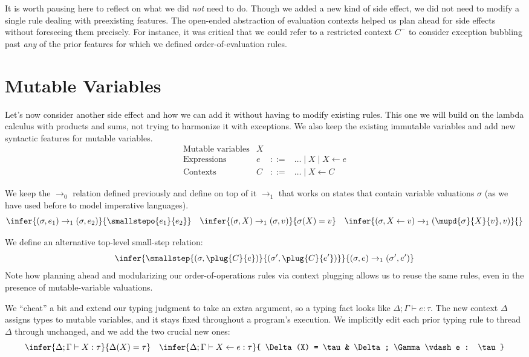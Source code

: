 \documentclass{amsbook}
\theoremstyle{definition}
\theoremstyle{remark}
\numberwithin{section}{chapter}
\numberwithin{equation}{chapter}
\begin{document}
It is worth pausing here to reflect on what we did \emph{not} need to do.
Though we added a new kind of side effect, we did not need to modify a single rule dealing with preexisting features.
The open-ended abstraction of evaluation contexts helped us plan ahead for side effects without foreseeing them precisely.
For instance, it was critical that we could refer to a restricted context $C^-$ to consider exception bubbling past \emph{any} of the prior features for which we defined order-of-evaluation rules.

\section{Mutable Variables\label{mutable_variables}}

Let's now consider another side effect and how we can add it without having to modify existing rules.
This one we will build on the lambda calculus with products and sums, not trying to harmonize it with exceptions.
We also keep the existing immutable variables and add new syntactic features for mutable variables.
$$\begin{array}{rrcl}
  \textrm{Mutable variables} & X \\
  \textrm{Expressions} & e &::=& \ldots \mid X \mid X \leftarrow e \\
  \textrm{Contexts} & C &::=& \ldots \mid X \leftarrow C
\end{array}$$

\newcommand{\smallstepw}[2]{#1 \to_1 #2}

We keep the $\rightarrow_0$ relation defined previously and define on top of it $\rightarrow_1$ that works on states that contain variable valuations $\sigma$ (as we have used before to model imperative languages).
$$\infer{\smallstepw{(\sigma, e_1)}{(\sigma, e_2)}}{
  \smallstepo{e_1}{e_2}
}
\quad \infer{\smallstepw{(\sigma, X)}{(\sigma, v)}}{
  \sigma(X) = v
}
\quad \infer{\smallstepw{(\sigma, X \leftarrow v)}{(\mupd{\sigma}{X}{v}, v)}}{
}$$

We define an alternative top-level small-step relation:
$$\infer{\smallstep{(\sigma, \plug{C}{e})}{(\sigma', \plug{C}{e'})}}{
  \smallstepw{(\sigma, e)}{(\sigma', e')}
}$$
Note how planning ahead and modularizing our order-of-operations rules via context plugging allows us to reuse the same rules, even in the presence of mutable-variable valuations.

\newcommand{\rhasty}[4]{#1; #2 \vdash #3 : #4}

We ``cheat'' a bit and extend our typing judgment to take an extra argument, so a typing fact looks like $\rhasty{\Delta}{\Gamma}{e}{\tau}$.
The new context $\Delta$ assigns types to mutable variables, and it stays fixed throughout a program's execution.
We implicitly edit each prior typing rule to thread $\Delta$ through unchanged, and we add the two crucial new ones:
$$\infer{\rhasty{\Delta}{\Gamma}{X}{\tau}}{
  \Delta(X) = \tau
}
\quad \infer{\rhasty{\Delta}{\Gamma}{X \leftarrow e}{\tau}}{
  \Delta(X) = \tau
  & \rhasty{\Delta}{\Gamma}{e}{\tau}
}$$
\end{document}
